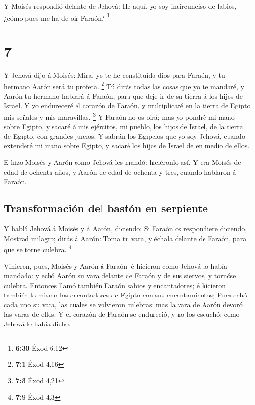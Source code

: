  Y Moisés respondió delante de Jehová: He aquí, yo soy
incircunciso de labios, ¿cómo pues me ha de oir Faraón? \footnote{\textbf{6:30}
  Éxod 6,12}

\hypertarget{section-6}{%
\section{7}\label{section-6}}

 Y Jehová dijo á Moisés: Mira, yo te he constituído dios
para Faraón, y tu hermano Aarón será tu profeta. \footnote{\textbf{7:1}
  Éxod 4,16}  Tú dirás todas las cosas que yo te mandaré,
y Aarón tu hermano hablará á Faraón, para que deje ir de su tierra á los
hijos de Israel.  Y yo endureceré el corazón de Faraón, y
multiplicaré en la tierra de Egipto mis señales y mis maravillas.
\footnote{\textbf{7:3} Éxod 4,21}  Y Faraón no os oirá;
mas yo pondré mi mano sobre Egipto, y sacaré á mis ejércitos, mi pueblo,
los hijos de Israel, de la tierra de Egipto, con grandes juicios.
 Y sabrán los Egipcios que yo soy Jehová, cuando extenderé
mi mano sobre Egipto, y sacaré los hijos de Israel de en medio de ellos.

 E hizo Moisés y Aarón como Jehová les mandó: hiciéronlo
así.  Y era Moisés de edad de ochenta años, y Aarón de
edad de ochenta y tres, cuando hablaron á Faraón.

\hypertarget{transformaciuxf3n-del-bastuxf3n-en-serpiente}{%
\subsection{Transformación del bastón en
serpiente}\label{transformaciuxf3n-del-bastuxf3n-en-serpiente}}

 Y habló Jehová á Moisés y á Aarón, diciendo:
 Si Faraón os respondiere diciendo, Mostrad milagro; dirás
á Aarón: Toma tu vara, y échala delante de Faraón, para que se torne
culebra. \footnote{\textbf{7:9} Éxod 4,3}

 Vinieron, pues, Moisés y Aarón á Faraón, é hicieron como
Jehová lo había mandado: y echó Aarón su vara delante de Faraón y de sus
siervos, y tornóse culebra.  Entonces llamó también
Faraón sabios y encantadores; é hicieron también lo mismo los
encantadores de Egipto con sus encantamientos;  Pues echó
cada uno su vara, las cuales se volvieron culebras: mas la vara de Aarón
devoró las varas de ellos.  Y el corazón de Faraón se
endureció, y no los escuchó; como Jehová lo había dicho.

